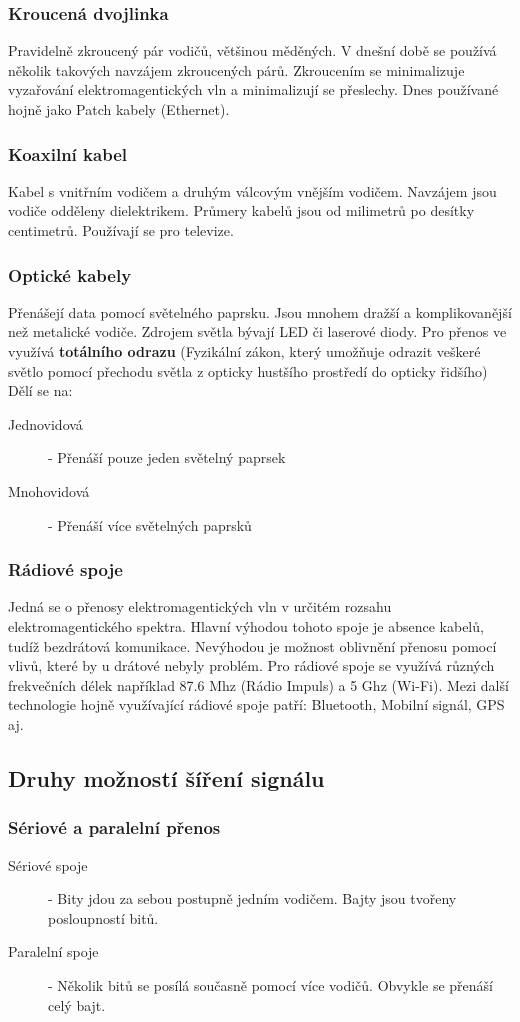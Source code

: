 \subsubsection{Kroucená dvojlinka}
Pravidelně zkroucený pár vodičů, většinou měděných.
V dnešní době se používá několik takových navzájem zkroucených párů.
Zkroucením se minimalizuje vyzařování elektromagentických vln a minimalizují se přeslechy.
Dnes používané hojně jako Patch kabely (Ethernet).
\subsubsection{Koaxilní kabel}
Kabel s vnitřním vodičem a druhým válcovým vnějším vodičem.
Navzájem jsou vodiče odděleny dielektrikem.
Průmery kabelů jsou od milimetrů po desítky centimetrů.
Používají se pro televize.
\subsubsection{Optické kabely}
Přenášejí data pomocí světelného paprsku.
Jsou mnohem dražší a komplikovanější než metalické vodiče.
Zdrojem světla bývají LED či laserové diody.
Pro přenos ve využívá \textbf{totálního odrazu} (Fyzikální zákon, který umožňuje odrazit veškeré světlo pomocí přechodu světla z opticky hustšího prostředí do opticky řidšího)
Dělí se na:
\begin{description}
  \item[Jednovidová] - Přenáší pouze jeden světelný paprsek
  \item[Mnohovidová] - Přenáší více světelných paprsků
\end{description}
\subsubsection{Rádiové spoje}
Jedná se o přenosy elektromagentických vln v určitém rozsahu elektromagentického spektra.
Hlavní výhodou tohoto spoje je absence kabelů, tudíž bezdrátová komunikace.
Nevýhodou je možnost oblivnění přenosu pomocí vlivů, které by u drátové nebyly problém.
Pro rádiové spoje se využívá různých frekvečních délek například 87.6 Mhz (Rádio Impuls) a 5 Ghz (Wi-Fi).
Mezi další technologie hojně využívající rádiové spoje patří: Bluetooth, Mobilní signál, GPS aj.
\subsection{Druhy možností šíření signálu}
\subsubsection{Sériové a paralelní přenos}
\begin{description}
  \item[Sériové spoje]- Bity jdou za sebou postupně jedním vodičem. Bajty jsou tvořeny posloupností bitů.
  \item[Paralelní spoje]- Několik bitů se posílá současně pomocí více vodičů. Obvykle se přenáší celý bajt.
\end{description}
